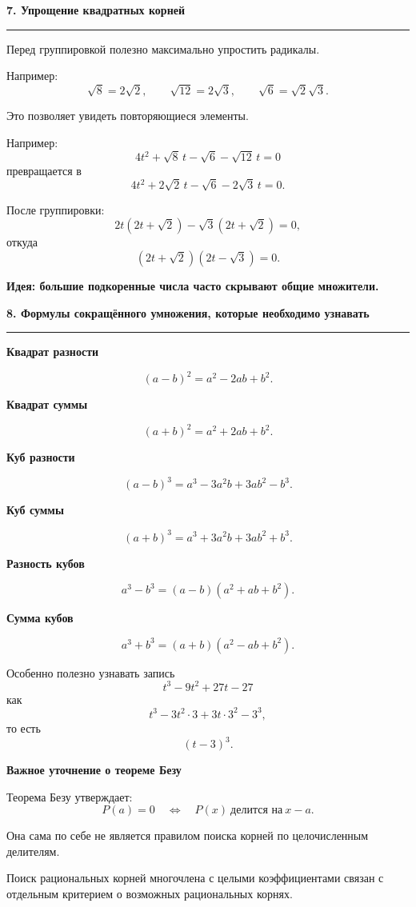 \documentclass[a4paper,12pt]{article}
\newcommand{\checktitle}[1]{%
    \vspace{0.4em}
    {\Large\bfseries\textcolor{darkaccent}{#1}}\par
    \vspace{0.25em}
    {\color{accent!55}\rule{\linewidth}{0.6pt}}
    \vspace{0.45em}
}
\newcommand{\subcheck}[1]{%
    \vspace{0.25em}
    {\large\bfseries\textcolor{accent}{#1}}\par
    \vspace{0.15em}
}
\newcommand{\important}[1]{\textbf{\textcolor{darkaccent}{#1}}}
\begin{document}
\checktitle{7. Упрощение квадратных корней}

Перед группировкой полезно максимально упростить радикалы.

Например:
\[
    \sqrt8=2\sqrt2,
    \qquad
    \sqrt{12}=2\sqrt3,
    \qquad
    \sqrt6=\sqrt2\sqrt3.
\]

Это позволяет увидеть повторяющиеся элементы.

Например:
\[
    4t^2+\sqrt8\,t-\sqrt6-\sqrt{12}\,t=0
\]
превращается в
\[
    4t^2+2\sqrt2\,t-\sqrt6-2\sqrt3\,t=0.
\]

После группировки:
\[
    2t(2t+\sqrt2)-\sqrt3(2t+\sqrt2)=0,
\]
откуда
\[
    (2t+\sqrt2)(2t-\sqrt3)=0.
\]

\important{Идея: большие подкоренные числа часто скрывают общие множители.}


\checktitle{8. Формулы сокращённого умножения, которые необходимо узнавать}

\subcheck{Квадрат разности}

\[
    (a-b)^2=a^2-2ab+b^2.
\]

\subcheck{Квадрат суммы}

\[
    (a+b)^2=a^2+2ab+b^2.
\]

\subcheck{Куб разности}

\[
    (a-b)^3
    =
    a^3-3a^2b+3ab^2-b^3.
\]

\subcheck{Куб суммы}

\[
    (a+b)^3
    =
    a^3+3a^2b+3ab^2+b^3.
\]

\subcheck{Разность кубов}

\[
    a^3-b^3
    =
    (a-b)(a^2+ab+b^2).
\]

\subcheck{Сумма кубов}

\[
    a^3+b^3
    =
    (a+b)(a^2-ab+b^2).
\]

Особенно полезно узнавать запись
\[
    t^3-9t^2+27t-27
\]
как
\[
    t^3-3t^2\cdot3+3t\cdot3^2-3^3,
\]
то есть
\[
    \boxed{(t-3)^3}.
\]

\subcheck{Важное уточнение о теореме Безу}

Теорема Безу утверждает:
\[
    P(a)=0
    \quad\Longleftrightarrow\quad
    P(x)\ \text{делится на}\ x-a.
\]

Она сама по себе не является правилом поиска корней по целочисленным делителям.

Поиск рациональных корней многочлена с целыми коэффициентами связан с отдельным критерием о возможных рациональных корнях.
\end{document}
